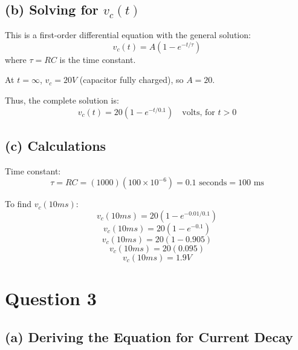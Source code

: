 \documentclass[12pt]{article}
\begin{document}
	\subsection*{(b) Solving for \( v_c(t) \)}
	
	This is a first-order differential equation with the general solution:
	\begin{equation}
		v_c(t) = A(1 - e^{-t/\tau})
	\end{equation}
	where \( \tau = RC \) is the time constant.
	
	At \( t = \infty \), \( v_c = 20V \) (capacitor fully charged), so \( A = 20 \).
	
	Thus, the complete solution is:
	\begin{equation}
		v_c(t) = 20(1 - e^{-t/0.1}) \quad \text{volts, for } t > 0
	\end{equation}
	
	\subsection*{(c) Calculations}
	
	Time constant:
	\begin{equation}
		\tau = RC = (1000)(100 \times 10^{-6}) = 0.1 \text{ seconds} = 100 \text{ ms}
	\end{equation}
	
	To find \( v_c(10ms) \):
	\begin{equation}
		v_c(10ms) = 20(1 - e^{-0.01/0.1})
	\end{equation}
	\begin{equation}
		v_c(10ms) = 20(1 - e^{-0.1})
	\end{equation}
	\begin{equation}
		v_c(10ms) = 20(1 - 0.905)
	\end{equation}
	\begin{equation}
		v_c(10ms) = 20(0.095)
	\end{equation}
	\begin{equation}
		v_c(10ms) = 1.9V
	\end{equation}
	
	
	
	
	

		\section*{Question 3}
		
		\subsection*{(a) Deriving the Equation for Current Decay}
		
\end{document}
